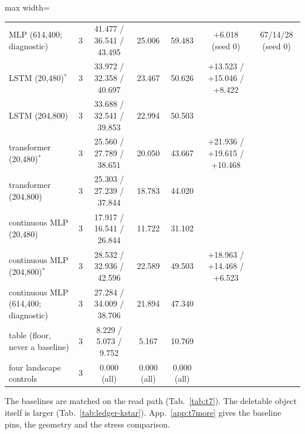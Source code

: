 \documentclass{article} %
\begin{document}
\begin{table}[t]
\begin{adjustbox}{max width=\linewidth}
\begin{tabular}{lcccccc}
MLP (614,400; diagnostic) & 3 & 41.477 / 36.541 / 43.495 & 25.006 & 59.483 & +6.018 (seed 0) & 67/14/28 (seed 0) \\
LSTM (20,480)$^\ast$ & 3 & 33.972 / 32.358 / 40.697 & 23.467 & 50.626 & +13.523 / +15.046 / +8.422 & \\
LSTM (204,800) & 3 & 33.688 / 32.541 / 39.853 & 22.994 & 50.503 & & \\
transformer (20,480)$^\ast$ & 3 & 25.560 / 27.789 / 38.651 & 20.050 & 43.667 & +21.936 / +19.615 / +10.468 & \\
transformer (204,800) & 3 & 25.303 / 27.239 / 37.844 & 18.783 & 44.020 & & \\
continuous MLP (20,480) & 3 & 17.917 / 16.541 / 26.844 & 11.722 & 31.102 & & \\
continuous MLP (204,800)$^\ast$ & 3 & 28.532 / 32.936 / 42.596 & 22.589 & 49.503 & +18.963 / +14.468 / +6.523 & \\
continuous MLP (614,400; diagnostic) & 3 & 27.284 / 34.009 / 38.706 & 21.894 & 47.340 & & \\
table (floor, never a baseline) & 3 & 8.229 / 5.073 / 9.752 & 5.167 & 10.769 & & \\
\midrule
four landscape controls & 3 & 0.000 (all) & 0.000 (all) & 0.000 (all) & & \\
\bottomrule
\end{tabular}\end{adjustbox}
\end{table}

\noindent The baselines are matched on the read path (Tab.~\ref{tab:t7}). The deletable
object itself is larger (Tab.~\ref{tab:ledger-kstar}). App.~\ref{app:t7more} gives the baseline pins, the geometry and the stress
comparison. %

\end{document}
